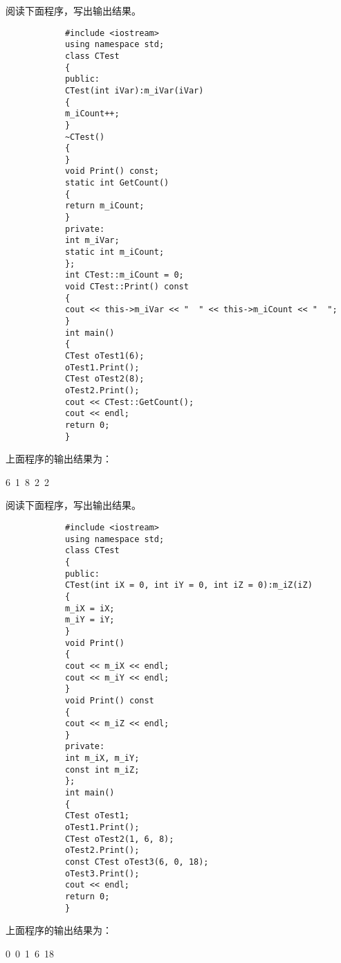 \documentclass[sealed,answers,prescorebox]{nwsuafexam}%
\begin{document}
\begin{questions}
	    \question
	    阅读下面程序，写出输出结果。
	    \begin{flushleft}
	    	\wuhao
		    \begin{verbatim}
	    	#include <iostream>
	    	using namespace std;
	    	class CTest
	    	{
	    	public:
	    	CTest(int iVar):m_iVar(iVar)
	    	{
	    	m_iCount++;
	    	}
	    	~CTest()
	    	{
	    	}
	    	void Print() const;
	    	static int GetCount()
	    	{
	    	return m_iCount;
	    	}
	    	private:
	    	int m_iVar;
	    	static int m_iCount;
	    	};
	    	int CTest::m_iCount = 0;
	    	void CTest::Print() const
	    	{
	    	cout << this->m_iVar << "  " << this->m_iCount << "  ";
	    	}
	    	int main()
	    	{
	    	CTest oTest1(6);
	    	oTest1.Print();
	    	CTest oTest2(8);
	    	oTest2.Print();
	    	cout << CTest::GetCount();
	    	cout << endl;
	    	return 0;
	    	}
		    \end{verbatim}
		\end{flushleft}
	    上面程序的输出结果为：
	    \begin{Answers}[1]
	    	6~1~8~2~2
	    \end{Answers}
	    
	    \question
	    阅读下面程序，写出输出结果。
	    \begin{flushleft}
	    	\wuhao
		    \begin{verbatim}
	    	#include <iostream>
	    	using namespace std;
	    	class CTest
	    	{
	    	public:
	    	CTest(int iX = 0, int iY = 0, int iZ = 0):m_iZ(iZ)
	    	{
	    	m_iX = iX;
	    	m_iY = iY;
	    	}
	    	void Print()
	    	{
	    	cout << m_iX << endl;
	    	cout << m_iY << endl;
	    	}
	    	void Print() const
	    	{
	    	cout << m_iZ << endl;
	    	}
	    	private:
	    	int m_iX, m_iY;
	    	const int m_iZ;
	    	};
	    	int main()
	    	{
	    	CTest oTest1;
	    	oTest1.Print();
	    	CTest oTest2(1, 6, 8);
	    	oTest2.Print();
	    	const CTest oTest3(6, 0, 18);
	    	oTest3.Print();
	    	cout << endl;
	    	return 0;
	    	}
		    \end{verbatim}
		\end{flushleft}
	    上面程序的输出结果为：
	    \begin{Answers}[1]
	    	0~0~1~6~18
	    \end{Answers}
	    

\end{questions}
\end{document}
